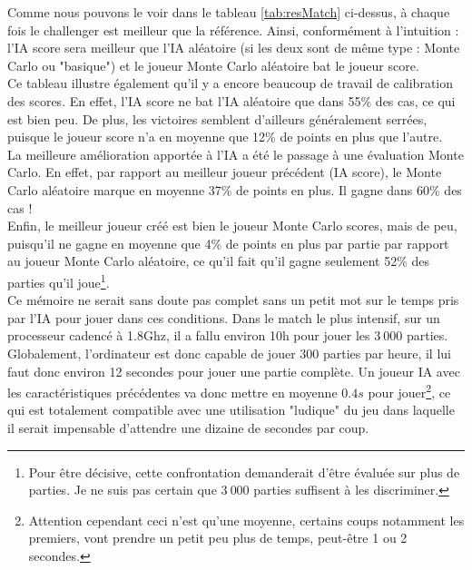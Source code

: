 \documentclass[a4paper,11pt]{article}
\begin{document}
Comme nous pouvons le voir dans le tableau \ref{tab:resMatch} ci-dessus, à chaque fois le challenger est meilleur que la référence. Ainsi, conformément à l'intuition : l'IA score sera meilleur que l'IA aléatoire (si les deux sont de même type : Monte Carlo ou "basique") et le joueur Monte Carlo aléatoire bat le joueur score. \\
Ce tableau illustre également qu'il y a encore beaucoup de travail de calibration des scores. En effet, l'IA score ne bat l'IA aléatoire que dans 55\% des cas, ce qui est bien peu. De plus, les victoires semblent d'ailleurs généralement serrées, puisque le joueur score n'a en moyenne que 12\% de points en plus que l'autre. \\
La meilleure amélioration apportée à l'IA a été le passage à une évaluation Monte Carlo. En effet, par rapport au meilleur joueur précédent (IA score), le Monte Carlo aléatoire marque en moyenne 37\% de points en plus. Il gagne dans 60\% des cas !\\
Enfin, le meilleur joueur créé est bien le joueur Monte Carlo scores, mais de peu, puisqu'il ne gagne en moyenne que 4\% de points en plus par partie par rapport au joueur Monte Carlo aléatoire, ce qu'il fait qu'il gagne seulement 52\% des parties qu'il joue\footnote{Pour être décisive, cette confrontation demanderait d'être évaluée sur plus de parties. Je ne suis pas certain que $3~000$ parties suffisent à les discriminer.}. \\

Ce mémoire ne serait sans doute pas complet sans un petit mot sur le temps pris par l'IA pour jouer dans ces conditions. Dans le match le plus intensif, sur un processeur cadencé à 1.8Ghz, il a fallu environ 10h pour jouer les $3~000$ parties. Globalement, l'ordinateur est donc capable de jouer 300 parties par heure, il lui faut donc environ 12 secondes pour jouer une partie complète. Un joueur IA avec les caractéristiques précédentes va donc mettre en moyenne $0.4s$ pour jouer\footnote{Attention cependant ceci n'est qu'une moyenne, certains coups notamment les premiers, vont prendre un petit peu plus de temps, peut-être 1 ou 2 secondes.}, ce qui est totalement compatible avec une utilisation "ludique" du jeu dans laquelle il serait impensable d'attendre une dizaine de secondes par coup.

\end{document}
